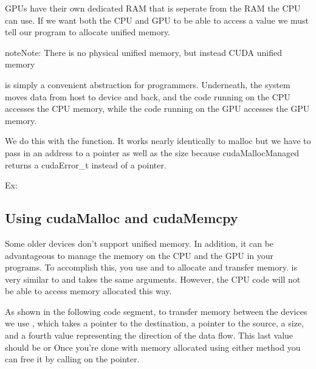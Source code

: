\documentclass[letterpaper,10pt,openany,oneside]{sphinxmanual}
\begin{document}
GPUs have their own dedicated RAM that is seperate from the RAM the CPU can use.
If we want both the CPU and GPU to be able to access a value we must tell our
program to allocate unified memory.

\begin{notice}{note}{Note:}
There is no physical unified memory, but instead CUDA unified memory
\end{notice}

is simply a convenient abstraction for programmers. Underneath, the system moves data from host to device and back, and the code running on the CPU accesses the CPU memory, while the code running on the GPU accesses the GPU memory.

We do this with the  function.
It works nearly identically to malloc but we have to pass in an address to a
pointer as well as the size because cudaMallocManaged returns a cudaError\_t
instead of a pointer.

Ex: 


\subsection{Using cudaMalloc and cudaMemcpy}
\label{0-Introduction/Introduction:using-cudamalloc-and-cudamemcpy}
Some older devices don't support unified memory.  In addition, it can be advantageous to
manage the memory on the CPU and the GPU in your programs.
To accomplish this, you use  and  to allocate and transfer memory.
 is very similar to  and takes the same
arguments. However, the CPU code will not be able to access memory allocated this
way.

As shown in the following code segment, to transfer memory between the devices we use , which takes a
pointer to the destination, a pointer to the source, a size, and a fourth value
representing the direction of the data flow.
This last value should be  or 
Once you're done with memory allocated using either method you can free it by
calling  on the pointer.
\end{document}
